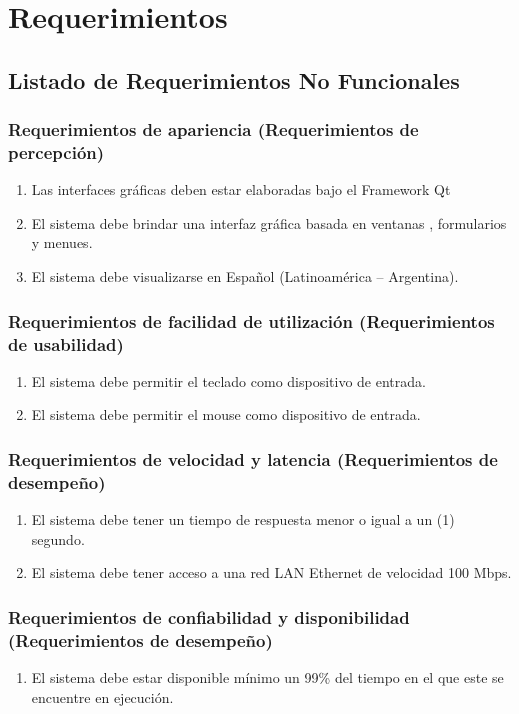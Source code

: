 \newpage
\section{\textcolor[gray]{.2}{Requerimientos}}
\subsection{\textcolor[gray]{.2}{Listado de Requerimientos No Funcionales}}
\subsubsection{\textcolor[gray]{.2}{Requerimientos de apariencia
(Requerimientos de percepción)}}
\begin{enumerate}
\item Las interfaces gráficas deben estar elaboradas bajo el Framework Qt
\item El sistema debe brindar una interfaz gráfica basada en ventanas ,
formularios y menues.
\item El sistema debe visualizarse en Español (Latinoamérica – Argentina).
\end{enumerate}


\subsubsection{\textcolor[gray]{.2}{Requerimientos de facilidad de utilización
(Requerimientos de usabilidad)}}
\begin{enumerate}
\item El sistema debe permitir el teclado como dispositivo de entrada.
\item El sistema debe permitir el mouse como dispositivo de entrada.
\end{enumerate}

\subsubsection{\textcolor[gray]{.2}{Requerimientos de velocidad y latencia
(Requerimientos de desempeño)}}
\begin{enumerate}
\item El sistema debe tener un tiempo de respuesta menor o igual a un (1)
segundo.
\item El sistema debe tener acceso a una red LAN Ethernet de velocidad 100 Mbps.
\end{enumerate}

\subsubsection{\textcolor[gray]{.2}{Requerimientos de confiabilidad y
disponibilidad (Requerimientos de desempeño)}}
\begin{enumerate}
\item El sistema debe estar disponible mínimo un 99\% del tiempo en el que este
se encuentre en ejecución.
\end{enumerate}

